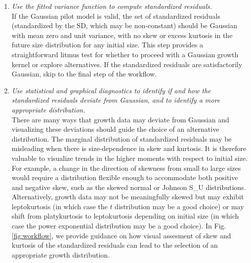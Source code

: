 \documentclass[11pt]{article}
\newcommand{\tom}[2]{{\color{red}{#1}}\footnote{\textit{\color{red}{#2}}}}
\begin{document}
{\begin{enumerate}
Accommodating non-constant variance in the pilot model means that it is not necessary to transform the data 
in a way that stabilizes the growth variance. 
Transformation remains an option when it does not create new problems (\tom{discussed later}{I think we will need to talk about the beta regression approach in the Discussion, and that could be a place to give an example of `new problems'.}), and it may be advantageous for reasons besides variance stabilization.
The natural log, in particular, is often an appropriate transformation of size data, because growth is commonly an exponential process, and helps avoid eviction at small sizes. 

\item \textit{Use the fitted variance function to compute standardized residuals.}
\\
If the Gaussian pilot model is valid, the set of standardized
residuals (standardized by the SD, which may be non-constant) should be Gaussian with mean zero and unit variance, with no skew or excess kurtosis in the future size distribution for any initial size.
This step provides a straightforward litmus test for whether to proceed with a Gaussian growth kernel or explore alternatives. 
If the standardized residuals are satisfactorily Gaussian, skip to the final step of the workflow. 

\item \textit{Use statistical and graphical diagnostics to identify if and how the standardized residuals deviate from Gaussian, and to identify a more appropriate distribution.}
\\
There are many ways that growth data may deviate from Gaussian and visualizing these deviations should guide the choice of an alternative distribution. 
The marginal distribution of standardized residuals may be misleading when there is size-dependence in skew and kurtosis. 
It is therefore valuable to visualize trends in the higher moments with respect to initial size. 
For example, a change in the direction of skewness from small to large sizes would require a distribution flexible enough to accommodate both positive and negative skew, such as the skewed normal or Johnson S_{U} distributions. 
Alternatively, growth data may not be meaningfully skewed but may exhibit leptokurtosis (in which case the $t$ distribution may be a good choice) or may shift from platykurtosis to leptokurtosis depending on initial size (in which case the power exponential distribution may be a good choice). 
In  Fig. \ref{fig:workflow}, we provide guidance on how visual assesment of skew and kurtosis of the standardized residuals can lead to the selection of an appropriate growth distribution.


\end{enumerate}}
\end{document}
